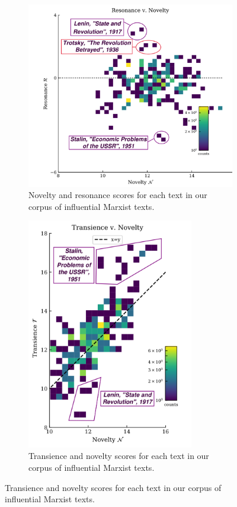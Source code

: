 \documentclass[11pt]{article}
\begin{document}
\begin{figure}[ht!]
	\centering
	\begin{subfigure}[t]{0.45\textwidth}
	\centering
	\includegraphics[width=\textwidth]{../figs/marxism_novelty_resonance.pdf}
	\caption{Novelty and resonance scores for each text in our corpus of influential Marxist texts.}
	\label{fig:novelty-resonance-marxism}
	\end{subfigure}
	\hfill
	\begin{subfigure}[t]{0.45\textwidth}
	\centering
	\includegraphics[width=0.8\textwidth]{../figs/marxism_transience_novelty.pdf}
	\caption{Transience and novelty scores for each text in our corpus of influential Marxist texts.}
	\label{fig:transience-novelty-marxism}
	\end{subfigure}
\end{figure}
\end{document}
